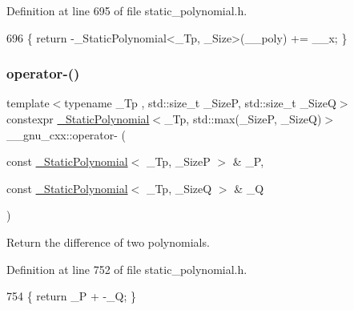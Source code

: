 Definition at line 695 of file static\+\_\+polynomial.\+h.


\begin{DoxyCode}
696     \{ \textcolor{keywordflow}{return} -\_StaticPolynomial<\_Tp, \_Size>(\_\_poly) += \_\_x; \}
\end{DoxyCode}
\mbox{\label{namespace____gnu__cxx_a7a0dd6f28607ef9be1e5eb053716076f}} 
\subsubsection{\texorpdfstring{operator-\/()}{operator-()}\hspace{0.1cm}{\footnotesize\ttfamily [3/6]}}
{\footnotesize\ttfamily template$<$typename \+\_\+\+Tp , std\+::size\+\_\+t \+\_\+\+SizeP, std\+::size\+\_\+t \+\_\+\+SizeQ$>$ \\
constexpr \hyperlink{class____gnu__cxx_1_1__StaticPolynomial}{\+\_\+\+Static\+Polynomial}$<$\+\_\+\+Tp, std\+::max(\+\_\+\+SizeP, \+\_\+\+SizeQ)$>$ \+\_\+\+\_\+gnu\+\_\+cxx\+::operator-\/ (\begin{DoxyParamCaption}\item[{const \hyperlink{class____gnu__cxx_1_1__StaticPolynomial}{\+\_\+\+Static\+Polynomial}$<$ \+\_\+\+Tp, \+\_\+\+SizeP $>$ \&}]{\+\_\+P,  }\item[{const \hyperlink{class____gnu__cxx_1_1__StaticPolynomial}{\+\_\+\+Static\+Polynomial}$<$ \+\_\+\+Tp, \+\_\+\+SizeQ $>$ \&}]{\+\_\+Q }\end{DoxyParamCaption})\hspace{0.3cm}{\ttfamily [inline]}}

Return the difference of two polynomials. 

Definition at line 752 of file static\+\_\+polynomial.\+h.


\begin{DoxyCode}
754     \{ \textcolor{keywordflow}{return} \_P + -\_Q; \}
\end{DoxyCode}
\mbox{\label{namespace____gnu__cxx_abc583ac0684f0aff079c6014f3d84c1d}} 
